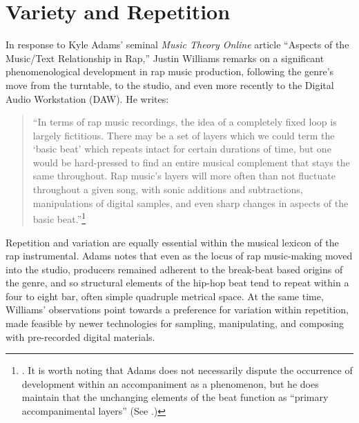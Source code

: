 \onehalfspacing 
\label{chapter2}
\section{Variety and Repetition}
In response to Kyle Adams' seminal \textit{Music Theory Online} article ``Aspects of the Music/Text
Relationship in Rap,'' Justin Williams remarks on a significant phenomenological development in rap 
music production, following the genre's move from the turntable, to the studio, and even more recently
to the Digital Audio Workstation (DAW). He writes:
    \begin{quote}
        \small ``In terms of rap music recordings, the idea of a completely fixed loop is largely fictitious.
        There may be a set of layers which we could term the `basic beat' which repeats intact for certain
        durations of time, but one would be hard-pressed to find an entire musical complement that stays the 
        same throughout. Rap music’s layers will more often than not fluctuate throughout a given song, with
        sonic additions and subtractions, manipulations of digital samples, and even sharp changes in aspects 
        of the basic beat.''\footnote{\cite{justinawilliamsBeatsFlowsResponse2009}. It is worth noting that 
        Adams does not necessarily dispute the occurrence of development within an accompaniment as a phenomenon,
        but he does maintain that the unchanging elements of the beat function as ``primary accompanimental
        layers'' (See \cite{kyleadamsPeopleInstinctiveAssumptions2009}.)}
    \end{quote}
Repetition and variation are equally essential within the musical lexicon of the rap instrumental. Adams 
notes that even as the locus of rap music-making moved into the studio, producers remained adherent to 
the break-beat based origins of the genre, and so structural elements of the hip-hop beat tend to repeat
within a four to eight bar, often simple quadruple metrical space. At the same time, Williams' observations
point towards a preference for variation within repetition, made feasible by newer technologies for sampling,
manipulating, and composing with pre-recorded digital materials.


